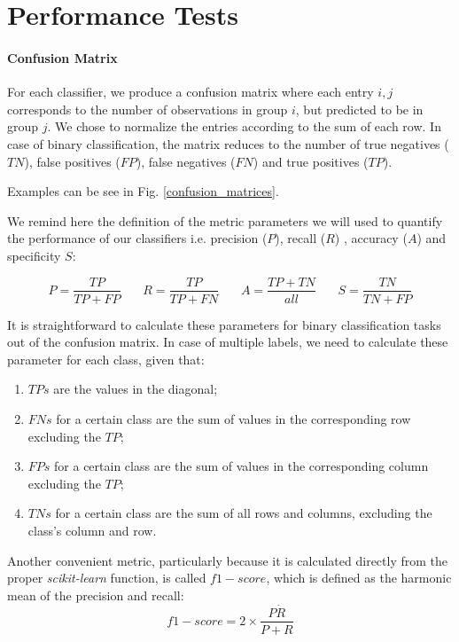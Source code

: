 \documentclass{article}
\begin{document}
\section{Performance Tests}

\paragraph{Confusion Matrix}
For each classifier, we produce a confusion matrix where each entry $i,j$ corresponds to the number of observations in group $i$, but predicted to be in group $j$. We chose to normalize the entries according to the sum of each row.
In case of binary classification, the matrix reduces to the number of true negatives ($TN$), false positives ($FP$), false negatives ($FN$) and true positives ($TP$).

Examples can be see in Fig. \ref{confusion_matrices}.

We remind here the definition of the metric parameters we will used to quantify the performance of our classifiers i.e. precision ($P$), recall ($R$) , accuracy ($A$) and specificity $S$:

\begin{equation}
P = \frac{TP}{TP + FP} \ \ \ \ \ \ \ \  R = \frac{TP}{TP + FN} \ \ \ \ \ \ \ \  A = \frac{TP + TN}{all}
\ \ \ \ \ \ \ \  S = \frac{TN}{TN + FP}
\end{equation}

It is straightforward to calculate these parameters for binary classification tasks out of the confusion matrix. In case of multiple labels, we need to calculate these parameter for each class, given that:
\begin{enumerate}
	\item  $TPs$ are the values in the diagonal; \
	\item  $FNs$ for a certain class are the sum of values in the corresponding row excluding the $TP$; \
	\item  $FPs$ for a certain class are the sum of values in the corresponding column excluding the $TP$; \
	\item  $TNs$ for a certain class are the sum of all rows and columns, excluding the class's column and row. \
\end{enumerate}


Another convenient metric, particularly because it is calculated directly from the proper \textit{scikit-learn} function, is called $f1-score$, which is defined as the harmonic mean of the precision and recall:
\begin{equation}
f1-score = 2 \times \frac{P \dot R }{P + R }
\end{equation}
\end{document}
